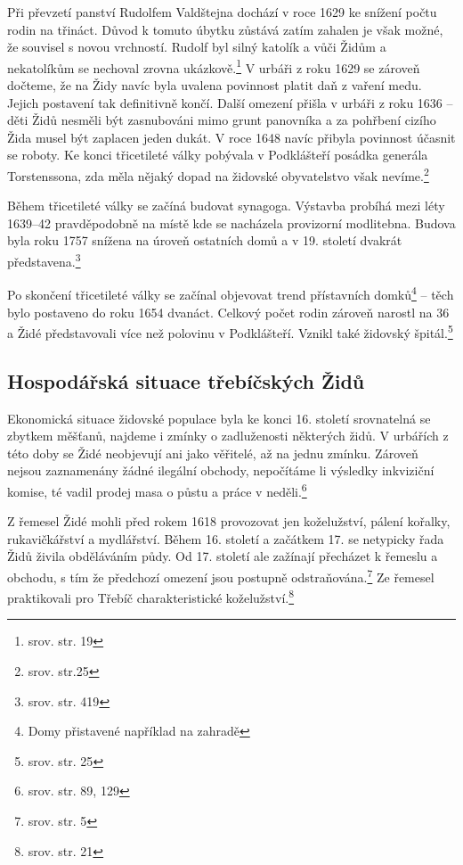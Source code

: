 \documentclass[a4paper,oneside,12pt]{report}
\begin{document}
Při převzetí panství Rudolfem Valdštejna dochází v roce 1629 ke snížení počtu rodin na třináct.
Důvod k tomuto úbytku zůstává zatím zahalen je však možné, že souvisel s novou vrchností.
Rudolf byl silný katolík a vůči Židům a nekatolíkům se nechoval zrovna ukázkově.\footnote{srov.  str. 19}
V urbáři z roku 1629 se zároveň dočteme, že na Židy navíc byla uvalena povinnost platit daň z vaření medu.
Jejich  postavení tak definitivně končí.
Další omezení přišla v urbáři z roku 1636 -- děti Židů nesměli být zasnubováni mimo grunt panovníka a za pohřbení cizího Žida musel být zaplacen jeden dukát.
V roce 1648 navíc přibyla povinnost účasnit se roboty.
Ke konci třicetileté války pobývala v Podklášteří posádka generála Torstenssona, zda měla nějaký dopad na židovské obyvatelstvo však nevíme.\footnote{srov. \cite{Fiser2005} str.25}

Během třicetileté války se začíná budovat  synagoga.
Výstavba probíhá mezi léty 1639--42 pravděpodobně na místě kde se nacházela provizorní modlitebna.
Budova byla roku 1757 snížena na úroveň ostatních domů a v 19. století dvakrát představena.\footnote{srov. \cite{Pekny2001} str. 419}

Po skončení třicetileté války se začínal objevovat trend přístavních domků\footnote{Domy přistavené například na zahradě} -- těch bylo postaveno do roku 1654 dvanáct.
Celkový počet rodin zároveň narostl na 36 a Židé představovali více než polovinu v Podklášteří.
Vznikl také židovský špitál.\footnote{srov. \cite{Fiser2005} str. 25}

\subsection{Hospodářská situace třebíčských Židů}

Ekonomická situace židovské populace byla ke konci 16. století srovnatelná se zbytkem měšťanů, najdeme i zmínky o zadluženosti některých židů.
V urbářích z této doby se Židé neobjevují ani jako věřitelé, až na jednu zmínku.
Zároveň nejsou zaznamenány žádné ilegální obchody, nepočítáme li výsledky inkviziční komise, té vadil prodej masa o půstu a práce v neděli.\footnote{srov. \cite{Uhlir1978} str. 89, 129}

Z řemesel Židé mohli před rokem 1618 provozovat jen koželužství, pálení kořalky, rukavičkářství a mydlářství.
Během 16. století a začátkem 17. se netypicky řada Židů živila obděláváním půdy.
Od 17. století ale zažínají přecházet k řemeslu a obchodu, s tím že předchozí omezení jsou postupně odstraňována.\footnote{srov. \cite{Klenovsky2003} str. 5}
Ze řemesel praktikovali pro Třebíč charakteristické koželužství.\footnote{srov.  str. 21}
\end{document}

